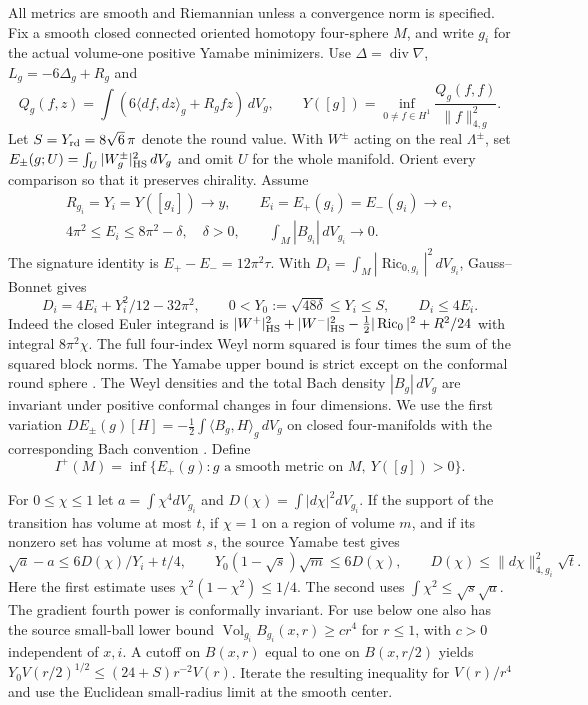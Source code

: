 \documentclass[11pt]{article}
\theoremstyle{definition}
\theoremstyle{remark}
\begin{document}
All metrics are smooth and Riemannian unless a convergence norm is specified. Fix a smooth closed connected oriented homotopy four-sphere \(M\), and write \(g_i\) for the actual volume-one positive Yamabe minimizers. Use \(\Delta=\operatorname{div}\nabla\), \(L_g=-6\Delta_g+R_g\) and
\[
 Q_g(f,z)=\int(6\langle df,dz\rangle_g+R_g fz)\,dV_g,
 \qquad
 Y([g])=\inf_{0\ne f\in H^1}\frac{Q_g(f,f)}{\|f\|_{4,g}^2}.
\]
Let \(S=Y_{\rm rd}=8\sqrt 6\,\pi\) denote the round value. With \(W^\pm\) acting on the real \(\Lambda^\pm\), set \(E_\pm(g;U)=\int_U|W_g^\pm|_{\rm HS}^2\,dV_g\) and omit \(U\) for the whole manifold. Orient every comparison so that it preserves chirality. Assume
\begin{equation}\label{eq:source}
 \begin{gathered}
  R_{g_i}=Y_i=Y([g_i])\to y,\qquad
  E_i=E_+(g_i)=E_-(g_i)\to e,\\
  4\pi^2\le E_i\le8\pi^2-\delta,\quad \delta>0,\qquad
  \int_M|B_{g_i}|\,dV_{g_i}\to0 .
 \end{gathered}
\end{equation}
The signature identity is \(E_+-E_-=12\pi^2\tau\). With \(D_i=\int_M|\operatorname{Ric}_{0,g_i}|^2\,dV_{g_i}\), Gauss--Bonnet gives
\begin{equation}\label{eq:budget}
 D_i=4E_i+Y_i^2/12-32\pi^2,
 \qquad 0<Y_0:=\sqrt{48\delta}\le Y_i\le S,
 \qquad D_i\le4E_i .
\end{equation}
Indeed the closed Euler integrand is \(|W^+|_{\rm HS}^2+|W^-|_{\rm HS}^2-\tfrac12|\operatorname{Ric}_0|^2+R^2/24\) with integral \(8\pi^2\chi\). The full four-index Weyl norm squared is four times the sum of the squared block norms. The Yamabe upper bound is strict except on the conformal round sphere \cite[Theorem 2]{Schoen1984Yamabe}. The Weyl densities and the total Bach density \(|B_g|\,dV_g\) are invariant under positive conformal changes in four dimensions. We use the first variation \(DE_\pm(g)[H]=-\tfrac12\int\langle B_g,H\rangle_g\,dV_g\) on closed four-manifolds with the corresponding Bach convention \cite[Introduction and \S3]{ChangGurskyYang2003}\cite[\S3]{GrahamHirachi2004Ambient}. Define
\[
 I^+(M)=\inf\{E_+(g): g\text{ a smooth metric on }M,\ Y([g])>0\}.
\]

For \(0\le \chi\le1\) let \(a=\int\chi^4dV_{g_i}\) and \(D(\chi)=\int|d\chi|^2dV_{g_i}\). If the support of the transition has volume at most \(t\), if \(\chi=1\) on a region of volume \(m\), and if its nonzero set has volume at most \(s\), the source Yamabe test gives
\begin{equation}\label{eq:yamabe-test}
 \sqrt a-a\le 6D(\chi)/Y_i+t/4,\qquad
 Y_0(1-\sqrt{s})\sqrt m\le 6D(\chi),\qquad
 D(\chi)\le \|d\chi\|_{4,g_i}^{2}\sqrt{t}.
\end{equation}
Here the first estimate uses \(\chi^2(1-\chi^2)\le1/4\). The second uses \(\int\chi^2\le\sqrt{s}\sqrt a\). The gradient fourth power is conformally invariant. For use below one also has the source small-ball lower bound \(\operatorname{Vol}_{g_i}B_{g_i}(x,r)\ge c r^4\) for \(r\le1\), with \(c>0\) independent of \(x,i\). A cutoff on \(B(x,r)\) equal to one on \(B(x,r/2)\) yields \(Y_0 V(r/2)^{1/2}\le(24+S) r^{-2}V(r)\). Iterate the resulting inequality for \(V(r)/r^4\) and use the Euclidean small-radius limit at the smooth center.
\end{document}
